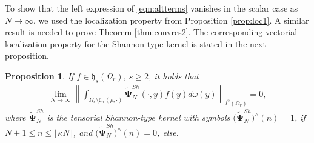 \documentclass[a4paper, 10pt]{article}
\numberwithin{equation}{section}
\newtheorem{prop}[thm]{Proposition}
\theoremstyle{definition}
\begin{document}
To show that the left expression of \eqref{eqn:altterms} vanishes in the scalar case as $N\to\infty$, we used the localization property from Proposition \ref{prop:loc1}. A similar result is needed to prove Theorem \ref{thm:convres2}. The corresponding vectorial localization property for the Shannon-type kernel is stated in the next proposition.

\begin{prop}\label{prop:loc} 
If $f\in\mathfrak{h}_s(\Omega_r)$, $s\geq 2$, it holds that
\begin{align}\label{eqn:locpropvect}
\lim_{N\to\infty}\left\|\int_{\Omega_r\setminus\mathcal{C}_r(\rho,\cdot)}\tilde{\mathbf{\Psi}}^{Sh}_N(\cdot,y)f(y)d\omega(y)\right\|_{l^2 (\Omega_r)}=0,
\end{align}
where $\tilde{\mathbf{\Psi}}^{Sh}_N$ is the tensorial Shannon-type kernel with symbols $\big(\tilde{\mathbf{\Psi}}_N^{Sh}\big)^\wedge(n)=1$, if $N +1\leq n\leq \lfloor\kappa N\rfloor$, and $\big(\tilde{\mathbf{\Psi}}_N^{Sh}\big)^\wedge(n)=0$, else.
\end{prop}
\end{document}
